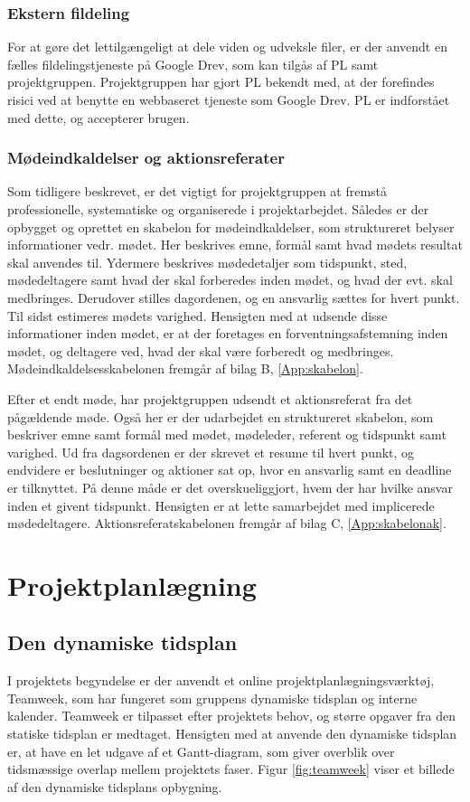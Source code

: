 	\subsubsection{Ekstern fildeling}
	For at gøre det lettilgængeligt at dele viden og udveksle filer, er der anvendt en fælles fildelingstjeneste på Google Drev, som kan tilgås af PL samt projektgruppen.  
	Projektgruppen har gjort PL bekendt med, at der forefindes risici ved at benytte en webbaseret tjeneste som Google Drev. PL er indforstået med dette, og accepterer brugen.
	 
	\subsubsection{Mødeindkaldelser og aktionsreferater}
	Som tidligere beskrevet, er det vigtigt for projektgruppen at fremstå professionelle, systematiske og organiserede i projektarbejdet. Således er der opbygget og oprettet en skabelon for mødeindkaldelser, som struktureret belyser informationer vedr. mødet. Her beskrives emne, formål samt hvad mødets resultat skal anvendes til. Ydermere beskrives mødedetaljer som tidspunkt, sted, mødedeltagere samt hvad der skal forberedes inden mødet, og hvad der evt. skal medbringes. Derudover stilles dagordenen, og en ansvarlig sættes for hvert punkt. Til sidst estimeres mødets varighed. Hensigten med at udsende disse informationer inden mødet, er at der foretages en forventningsafstemning inden mødet, og deltagere ved, hvad der skal være forberedt og medbringes. Mødeindkaldelsesskabelonen fremgår af bilag B, \ref{App:skabelon}.  
	
	Efter et endt møde, har projektgruppen udsendt et aktionsreferat fra det pågældende møde. Også her er der udarbejdet en struktureret skabelon, som beskriver emne samt formål med mødet, mødeleder, referent og tidspunkt samt varighed. Ud fra dagsordenen er der skrevet et resume til hvert punkt, og endvidere er beslutninger og aktioner sat op, hvor en ansvarlig samt en deadline er tilknyttet. På denne måde er det overskueliggjort, hvem der har hvilke ansvar inden et givent tidspunkt. Hensigten er at lette samarbejdet med implicerede mødedeltagere. Aktionsreferatskabelonen fremgår af bilag C, \ref{App:skabelonak}.        
	
\section{Projektplanlægning}  
\subsection{Den dynamiske tidsplan} 
I projektets begyndelse er der anvendt et online projektplanlægningsværktøj, Teamweek, som har fungeret som gruppens dynamiske tidsplan og interne kalender. Teamweek er tilpasset efter projektets behov, og større opgaver fra den statiske tidsplan er medtaget. Hensigten med at anvende den dynamiske tidsplan er, at have en let udgave af et Gantt-diagram, som giver overblik over tidsmæssige overlap mellem projektets faser. Figur \ref{fig:teamweek} viser et billede af den dynamiske tidsplans opbygning.  

